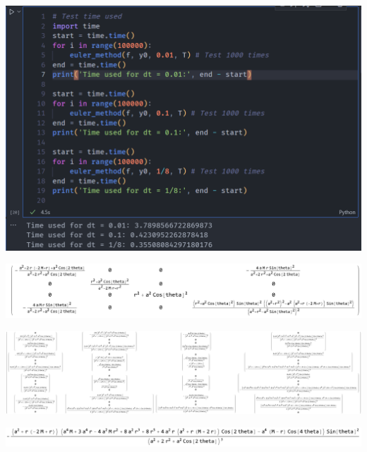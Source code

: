 \documentclass{beamer}
\begin{document}
\begin{frame}{}
    \centering

    \includegraphics[width=\textwidth]{asset/speed_test.png}

\end{frame}


\begin{frame}{}
    \includegraphics[width=\textwidth]{asset/kerr_metric.png}

\end{frame}


\begin{frame}{}
    \centering

    \includegraphics[width=\textwidth]{asset/christ.png}

\end{frame}


\begin{frame}{}
    \centering

    \includegraphics[width=\textwidth]{asset/christ_detail.png}

\end{frame}
\end{document}
